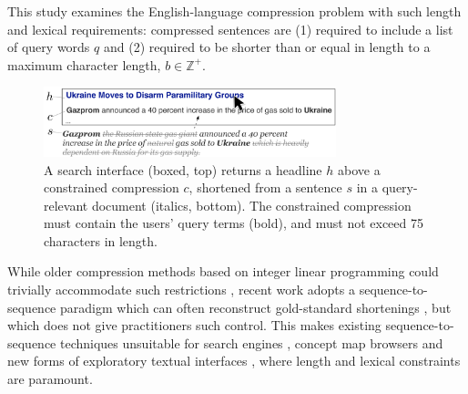\documentclass[11pt,a4paper]{article}
\begin{document}
This study examines the English-language compression problem with such length and lexical requirements: compressed sentences are (1) required to include a list of query words $q$ and (2) required to be shorter than or equal in length to a maximum character length, $b \in \mathbb{Z}^{+}$. 

\begin{figure}[htb!]
\includegraphics[width=8.5cm]{qf.pdf}
\caption{A search interface (boxed, top) returns a headline $h$ above a constrained compression $c$, shortened from a sentence $s$ in a query-relevant document (italics, bottom). The constrained compression must contain the users' query terms (bold), and must not exceed 75 characters in length.}
\label{f:qf}
\end{figure}


While older compression methods based on integer linear programming could trivially accommodate such restrictions \cite{clarke2008global,filippova2013overcoming}, recent work adopts a sequence-to-sequence paradigm which can often reconstruct gold-standard shortenings \cite{filippova2015sentence}, but which does not give practitioners such control. This makes existing sequence-to-sequence techniques unsuitable for search engines \cite{hearst2009search}, concept map browsers \cite{falke2017graphdocexplore} and new forms of exploratory textual interfaces \cite{marchionini2006exploratory}, where length and lexical constraints are paramount. 
\end{document}
